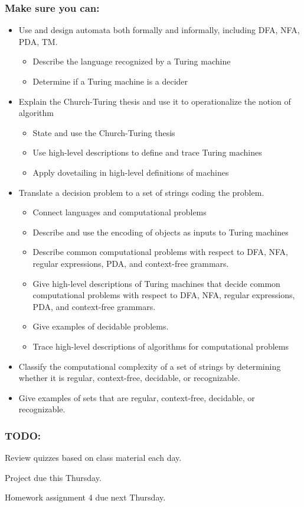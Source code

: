 \subsubsection*{Make sure you can:}
\begin{itemize}
\item Use and design automata both formally and informally, including DFA, NFA, PDA, TM.
    \begin{itemize}
        \item Describe the language recognized by a Turing machine
        \item Determine if a Turing machine is a decider
    \end{itemize}
\item Explain the Church-Turing thesis and use it to operationalize the notion of algorithm
    \begin{itemize}
        \item State and use the Church-Turing thesis
        \item Use high-level descriptions to define and trace Turing machines
        \item Apply dovetailing in high-level definitions of machines
    \end{itemize}
\item Translate a decision problem to a set of strings coding the problem.
    \begin{itemize}
        \item Connect languages and computational problems
        \item Describe and use the encoding of objects as inputs to Turing machines
        \item Describe common computational problems with respect to DFA, NFA, regular expressions, PDA, and context-free grammars.
        \item Give high-level descriptions of Turing machines that decide common computational problems with respect to DFA, NFA, regular expressions, PDA, and context-free grammars.
        \item Give examples of decidable problems.
        \item Trace high-level descriptions of algorithms for computational problems
    \end{itemize}
\item Classify the computational complexity of a set of strings by determining whether it is regular, context-free, decidable, or recognizable.
\item Give examples of sets that are regular, context-free, decidable, or recognizable.
\end{itemize}

\begin{comment}
\end{comment}

\subsubsection*{TODO:}
\begin{list}
   {\itemsep2pt}
   \item Review quizzes based on class material each day.
   \item Project due this Thursday.
   \item Homework assignment 4 due next Thursday.
\end{list}


